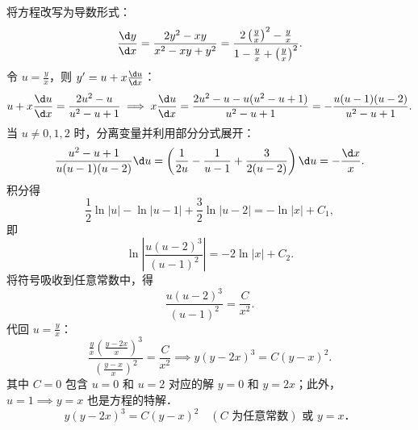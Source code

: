 \begin{solution}

    将方程改写为导数形式：
    \begin{equation}
        \frac{\d y}{\d x}
        = \frac{2y^2 - xy}{x^2 - xy + y^2}
        = \frac{2\left(\frac{y}{x}\right)^2 - \frac{y}{x}}
        {1 - \frac{y}{x} + \left(\frac{y}{x}\right)^2}.
    \end{equation}
    令 $u = \frac{y}{x}$，则 $y' = u + x \frac{\d u}{\d x}$：
    \begin{equation}
        u + x \frac{\d u}{\d x}
        = \frac{2u^2 - u}{u^2 - u + 1}
        \implies
        x \frac{\d u}{\d x}
        = \frac{2u^2 - u - u(u^2 - u + 1)}{u^2 - u + 1}
        = -\frac{u(u - 1)(u - 2)}{u^2 - u + 1}.
    \end{equation}
    当 $u \neq 0,1,2$ 时，分离变量并利用部分分式展开：
    \begin{equation}
        \frac{u^2 - u + 1}{u(u - 1)(u - 2)}\d u
        = \left(
        \frac{1}{2u}
        - \frac{1}{u - 1}
        + \frac{3}{2(u - 2)}
        \right)\d u
        = -\frac{\d x}{x}.
    \end{equation}
    积分得
    \begin{equation}
        \frac{1}{2}\ln|u|
        - \ln|u - 1|
        + \frac{3}{2}\ln|u - 2|
        = -\ln|x| + C_1,
    \end{equation}
    即
    \begin{equation}
        \ln\left|
        \frac{u(u-2)^3}{(u-1)^2}
        \right|
        = -2\ln|x| + C_2.
    \end{equation}
    将符号吸收到任意常数中，得
    \begin{equation}
        \frac{u(u-2)^3}{(u-1)^2}
        = \frac{C}{x^2}.
    \end{equation}
    代回 $u = \frac{y}{x}$：
    \begin{equation}
        \frac{\frac{y}{x}
            \left(\frac{y - 2x}{x}\right)^3}
        {\left(\frac{y - x}{x}\right)^2}
        = \frac{C}{x^2}
        \implies
        y(y - 2x)^3 = C(y - x)^2.
    \end{equation}
    其中 $C=0$ 包含 $u=0$ 和 $u=2$ 对应的解 $y=0$ 和 $y=2x$；此外，$u=1 \implies y=x$ 也是方程的特解．
    \begin{equation}
        \boxed{
            y(y - 2x)^3 = C(y - x)^2
            \quad (C \text{ 为任意常数})
            \text{ 或 } y=x．
        }
    \end{equation}



\end{solution}
